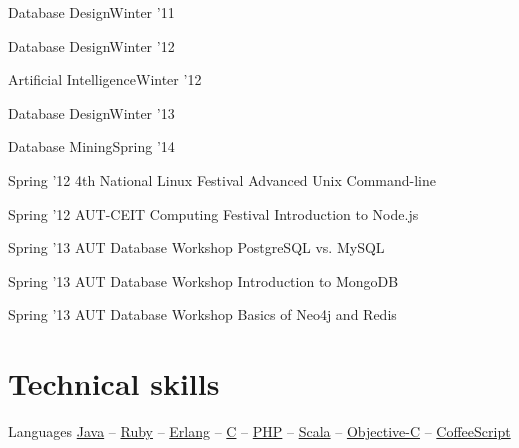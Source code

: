 \documentclass{tccv}
\begin{document}
{{\begin{ta}

\item{Database Design}{Winter '11}

\item{Database Design}{Winter '12}

\item{Artificial Intelligence}{Winter '12}

\item{Database Design}{Winter '13}

\item{Database Mining}{Spring '14}

\end{ta}



\vspace{15pt}


\begin{presenter}

\item{Spring '12}
	 {4th National Linux Festival}
	 {Advanced Unix Command-line}

\item{Spring '12}
	 {AUT-CEIT Computing Festival}
	 {Introduction to Node.js}


\item{Spring '13}
	 {AUT Database Workshop}
	 {PostgreSQL vs. MySQL}

\item{Spring '13}
	 {AUT Database Workshop}
	 {Introduction to MongoDB}

\item{Spring '13}
	 {AUT Database Workshop}
	 {Basics of Neo4j and Redis}
\end{presenter}


\vspace{-15pt}









\section{Technical skills}

\begin{factlist}

\item{Languages}
     {
     \href{http://www.oracle.com/technetwork/java/}{Java} -- 
     \href{https://www.ruby-lang.org/en/}{Ruby} -- 
     \href{http://www.erlang.org}{Erlang} -- 
     \href{https://en.wikipedia.org/wiki/C_(programming_language)}{C} -- 
     \href{http://php.net}{PHP} -- 
     \href{http://www.scala-lang.org}{Scala} -- 
     \href{https://en.wikipedia.org/wiki/Objective-C}{Objective-C} -- 
     \href{http://coffeescript.org}{CoffeeScript}%
     }


\end{factlist}}}
\end{document}
